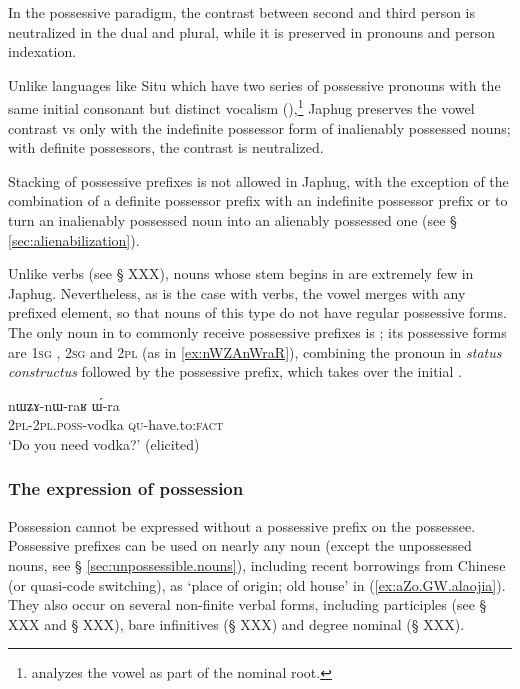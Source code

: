 In the possessive paradigm, the contrast between second and third person is neutralized in the dual and plural, while it is preserved in pronouns and person indexation.

Unlike languages like Situ which have two series of possessive pronouns with the same initial consonant but distinct vocalism (\citealt[168-169]{linxr93jiarongen}),\footnote{\citet[118-119]{prins16kyomkyo} analyzes the vowel as part of the nominal root.} Japhug preserves the vowel contrast  vs  only with the indefinite possessor form of inalienably possessed nouns; with definite possessors, the contrast is neutralized.

Stacking of possessive prefixes is not allowed in Japhug, with the exception of the combination of a definite possessor prefix with an indefinite possessor prefix  or  to turn an inalienably possessed noun into an alienably possessed one (see § \ref{sec:alienabilization}).

Unlike verbs (see § XXX), nouns whose stem begins in  are extremely few in Japhug. Nevertheless, as is the case with verbs, the vowel  merges with any prefixed element, so that nouns of this type do not have regular possessive forms. The only noun in  to commonly receive possessive prefixes is ; its possessive forms are \textsc{1sg} , \textsc{2sg}  and \textsc{2pl}  (as in \ref{ex:nWZAnWraR}), combining the pronoun in \textit{status constructus} followed by the possessive prefix, which takes over the initial .

\begin{exe}
\ex \label{ex:nWZAnWraR}
\gll nɯʑɤ-nɯ-raʁ ɯ́-ra \\
\textsc{2pl}-\textsc{2pl.poss}-vodka \textsc{qu}-have.to:\textsc{fact} \\
\glt `Do you need vodka?' (elicited)
\end{exe}

\subsubsection{The expression of possession}
Possession cannot be expressed without a possessive prefix on the possessee. Possessive prefixes can be used on nearly any noun (except the unpossessed nouns, see § \ref{sec:unpossessible.nouns}), including recent borrowings from Chinese (or quasi-code switching), as   `place of origin; old house' in (\ref{ex:aZo.GW.alaojia}). They also occur on several non-finite verbal forms, including participles (see § XXX and § XXX), bare infinitives (§ XXX) and degree nominal (§ XXX).

